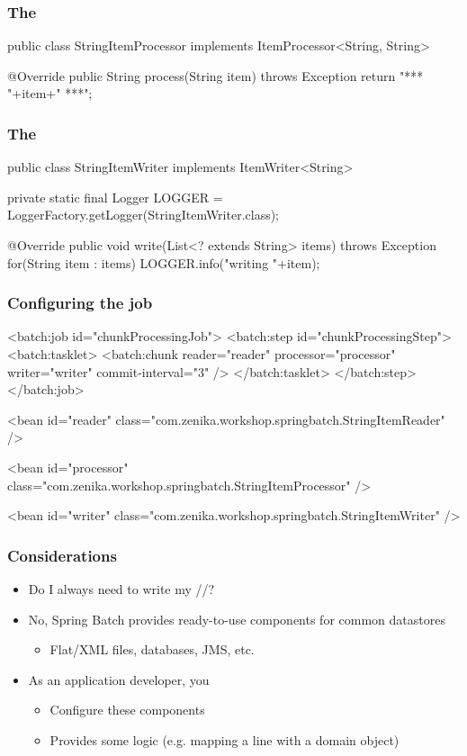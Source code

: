 \begin{frame}[fragile]
\frametitle{The }
\begin{javacode}
public class StringItemProcessor 
       implements ItemProcessor<String, String> {

  @Override
  public String process(String item) throws Exception {
    return "*** "+item+" ***";
  }

}
\end{javacode}
\end{frame}

\begin{frame}[fragile]
\frametitle{The }
\begin{javacode}
public class StringItemWriter implements ItemWriter<String> {

  private static final Logger LOGGER =
    LoggerFactory.getLogger(StringItemWriter.class);

  @Override
  public void write(List<? extends String> items) throws Exception {
    for(String item : items) {
      LOGGER.info("writing "+item);
    }
  }

}
\end{javacode}
\end{frame}

\begin{frame}[fragile]
\frametitle{Configuring the job}
\begin{xmlcode}
<batch:job id="chunkProcessingJob">
  <batch:step id="chunkProcessingStep">
    <batch:tasklet>
      <batch:chunk reader="reader" processor="processor" 
                   writer="writer" commit-interval="3"
      />
    </batch:tasklet>
  </batch:step>
</batch:job>

<bean id="reader" 
      class="com.zenika.workshop.springbatch.StringItemReader" />

<bean id="processor" 
      class="com.zenika.workshop.springbatch.StringItemProcessor" />

<bean id="writer" 
      class="com.zenika.workshop.springbatch.StringItemWriter" />
\end{xmlcode}
\end{frame}

\begin{frame}
 \frametitle{Considerations}
 \begin{itemize}
  \item Do I always need to write my //?
  \item No, Spring Batch provides ready-to-use components for common datastores
  \begin{itemize}
    \item Flat/XML files, databases, JMS, etc.
  \end{itemize}
  \item As an application developer, you
  \begin{itemize}
    \item Configure these components
    \item Provides some logic (e.g. mapping a line with a domain object)
  \end{itemize}
 \end{itemize}
\end{frame}

